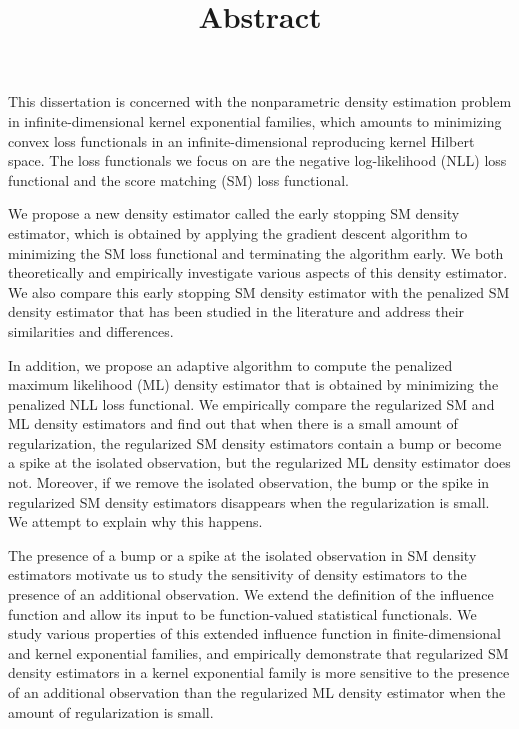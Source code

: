 \documentclass[12pt]{article}
\title{ \setstretch{1.0} \textbf{ \Large Abstract}}
\author{}
\date{}
\theoremstyle{definition}
\theoremstyle{theorem}
\theoremstyle{remark}
\begin{document}
\thispagestyle{plain}
\maketitle


This dissertation is concerned with the nonparametric density estimation problem in infinite-dimensional kernel exponential families, which amounts to minimizing convex loss functionals in an infinite-dimensional reproducing kernel Hilbert space. The loss functionals we focus on are the negative log-likelihood (NLL) loss functional and the score matching (SM) loss functional. 

We propose a new density estimator called the early stopping SM density estimator, which is obtained by applying the gradient descent algorithm to minimizing the SM loss functional and terminating the algorithm early. We both theoretically and empirically investigate various aspects of this density estimator. We also compare this early stopping SM density estimator with the penalized SM density estimator that has been studied in the literature and address their similarities and differences. 

In addition, we propose an adaptive algorithm to compute the penalized maximum likelihood (ML) density estimator that is obtained by minimizing the penalized NLL loss functional. We empirically compare the regularized SM and ML density estimators and find out that when there is a small amount of regularization, the regularized SM density estimators contain a bump or become a spike at the isolated observation, but the regularized ML density estimator does not. Moreover, if we remove the isolated observation, the bump or the spike in regularized SM density estimators disappears when the regularization is small. We attempt to explain why this happens. 

The presence of a bump or a spike at the isolated observation in SM density estimators motivate us to study the sensitivity of density estimators to the presence of an additional observation. We extend the definition of the influence function and allow its input to be function-valued statistical functionals. We study various properties of this extended influence function in finite-dimensional and kernel exponential families, and empirically demonstrate that regularized SM density estimators in a kernel exponential family is more sensitive to the presence of an additional observation than the regularized ML density estimator when the amount of regularization is small. 
\end{document}
